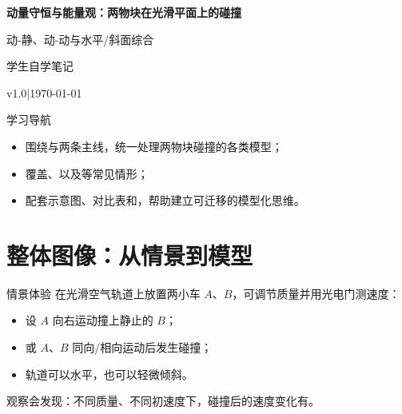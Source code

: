 \documentclass[a4paper,11pt]{ctexart}
\renewcommand{\notetitle}{动量守恒与能量观：两物块在光滑平面上的碰撞}
\renewcommand{\notesubtitle}{动-静、动-动与水平/斜面综合}
\renewcommand{\noteauthor}{学生自学笔记}
\renewcommand{\noteversion}{v1.0}
\renewcommand{\notedate}{\today}
\begin{document}
\MathNoteEnableReviewStamp
\MathNoteEnablePrint

\thispagestyle{empty}
\setcounter{page}{1}

\noindent
\begin{minipage}[t][0.7\textheight][c]{\textwidth}
  \raggedleft
  \vspace*{\fill}
  {\sffamily\bfseries\Huge\color{accent}\notetitle\par}
  \vspace{0.6em}
  {\Large\color{inkgray}\notesubtitle\par}
  \vspace{0.5em}
  {\large\color{inkgray}\noteauthor\par}
  \vspace{0.4em}
  {\normalsize\color{inkgray}\noteversion\quad|\quad\notedate\par}
  \vspace*{\fill}
\end{minipage}

\begin{center}
\begin{minipage}{0.84\textwidth}
  \textcolor{inkgray}{\sffamily\small 学习导航}\\
  \begin{itemize}
    \item 围绕与两条主线，统一处理两物块碰撞的各类模型；
    \item 覆盖、以及等常见情形；
    \item 配套示意图、对比表和，帮助建立可迁移的模型化思维。
  \end{itemize}
\end{minipage}
\end{center}
\vspace{1em}

\clearpage
\thispagestyle{plain}
\tableofcontents
\newpage

\section{整体图像：从情景到模型}

\begin{examplebox}{情景体验}
在光滑空气轨道上放置两小车 $A$、$B$，可调节质量并用光电门测速度：\par
\begin{itemize}
  \item 设 $A$ 向右运动撞上静止的 $B$；
  \item 或 $A$、$B$ 同向/相向运动后发生碰撞；
  \item 轨道可以水平，也可以轻微倾斜。
\end{itemize}
观察会发现：不同质量、不同初速度下，碰撞后的速度变化有。
\end{examplebox}
\end{document}
